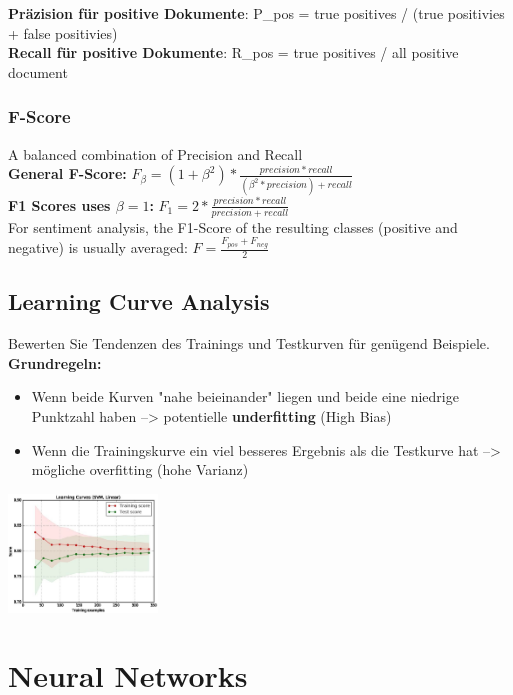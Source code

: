 \documentclass{article}
\newenvironment{Figure}
	{\par\medskip\noindent\minipage{\linewidth}}
	{\endminipage\par\medskip}
\theoremstyle{merke}
\theoremstyle{definition}
\begin{document}
    \textbf{Präzision für positive Dokumente}: P_pos = true positives / (true positivies + false positivies)\\
    \textbf{Recall für positive Dokumente}: R_pos = true positives / all positive document

        \subsection{F-Score}
    A balanced combination of Precision and Recall\\
    \textbf{General F-Score:} $F_\beta = (1 + \beta^2) * \frac{precision * recall}{(\beta^2 * precision) + recall}$ \\
    \textbf{F1 Scores uses $\beta = 1$:} $F_1 = 2 * \frac{precision * recall}{precision + recall}$\\
    For sentiment analysis, the F1-Score of the resulting classes (positive and negative) is usually averaged: $F = \frac{F_{pos} + F_{neg}}{2}$


    \section{Learning Curve Analysis}
    Bewerten Sie Tendenzen des Trainings und Testkurven für genügend Beispiele.
    \textbf{Grundregeln:}
    \begin{itemize}
        \item Wenn beide Kurven "nahe beieinander" liegen und beide eine niedrige Punktzahl haben --> potentielle \textbf{underfitting} (High Bias)
        \item Wenn die Trainingskurve ein viel besseres Ergebnis als die Testkurve hat --> mögliche overfitting (hohe Varianz)
    \end{itemize}
    \begin{Figure}
        \centering
        \includegraphics[width=150px]{img/LearningCurve.png}
            \label{fig:Abbildung einer Learning Curve}
    \end{Figure}

\chapter{Neural Networks}
\end{document}
